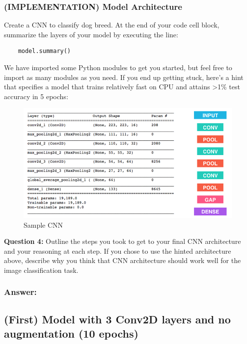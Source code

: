 \documentclass[11pt]{article}
\makeatletter
\def\maxwidth{\ifdim\Gin@nat@width>\linewidth\linewidth
    \else\Gin@nat@width\fi}
\let\Oldincludegraphics\includegraphics
\renewcommand{\includegraphics}[1]{\Oldincludegraphics[width=.8\maxwidth]{#1}}
\makeatother
\begin{document}
    \hypertarget{implementation-model-architecture}{%
\subsubsection{(IMPLEMENTATION) Model
Architecture}\label{implementation-model-architecture}}

Create a CNN to classify dog breed. At the end of your code cell block,
summarize the layers of your model by executing the line:

\begin{verbatim}
    model.summary()
\end{verbatim}

We have imported some Python modules to get you started, but feel free
to import as many modules as you need. If you end up getting stuck,
here's a hint that specifies a model that trains relatively fast on CPU
and attains \textgreater{}1\% test accuracy in 5 epochs:

\begin{figure}
\centering
\includegraphics{images/sample_cnn.png}
\caption{Sample CNN}
\end{figure}

\textbf{Question 4:} Outline the steps you took to get to your final CNN
architecture and your reasoning at each step. If you chose to use the
hinted architecture above, describe why you think that CNN architecture
should work well for the image classification task.

    \hypertarget{answer}{%
\subsubsection{Answer:}\label{answer}}

\hypertarget{first-model-with-3-conv2d-layers-and-no-augmentation-10-epochs}{%
\subsection{(First) Model with 3 Conv2D layers and no augmentation (10
epochs)}\label{first-model-with-3-conv2d-layers-and-no-augmentation-10-epochs}}
\end{document}
